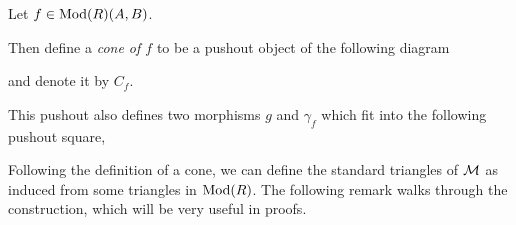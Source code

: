 \begin{definition}
    \label{def:stmod_cone}
    Let \( f \in \operatorname{Mod}(R)(A, B) \).
    
    Then define a \emph{cone of \( f \)} to be a pushout object of the following diagram
    \begin{center}
    \end{center}
    and denote it by \( C_f \).

    This pushout also defines two morphisms \( g \) and \( \gamma_f \) which fit into the following pushout square,
    \begin{center}
    \end{center}
\end{definition}

Following the definition of a cone, we can define the standard triangles of \( {\mathcal{M}} \) as induced from some triangles in \( \operatorname{Mod}(R) \). The following remark walks through the construction, which will be very useful in proofs.

